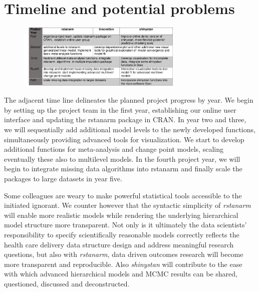 \documentclass[11pt,notitlepage]{article}
\begin{document}
\section*{Timeline and potential problems}

\begin{figure} %
    \centering
\includegraphics[width=0.7\textwidth]{Figures/Timeline.pdf}
\end{figure}

The adjacent time line delineates the planned project progress by year. We begin by setting up the project team in the first year, establishing our online user interface and updating the rstanarm package in CRAN. In year two and three, we will sequentially add additional model levels to the newly developed functions, simultaneously providing advanced tools for visualization. We start to develop additional functions for meta-analysis and change point models, scaling eventually these also to multilevel models. In the fourth project year, we will begin to integrate missing data algorithms into rstanarm and finally scale the packages to large datasets in year five.

Some colleagues are weary to make powerful statistical tools accessible to the initiated ignorant. We counter however that the syntactic simplicity of \textit{rstanarm} will enable more realistic models while rendering the underlying hierarchical model structure more transparent. Not only is it ultimately the data scientists' responsibility to specify scientifically reasonable  models correctly reflects the health care delivery data structure design and address meaningful research questions, but also with \textit{rstanarm}, data driven outcomes research will become more transparent and reproducible. Also \textit{shinystan} will contribute to the ease with which advanced hierarchical models and MCMC results can be shared, questioned, discussed and deconstructed.
 



\newpage


\end{document}
